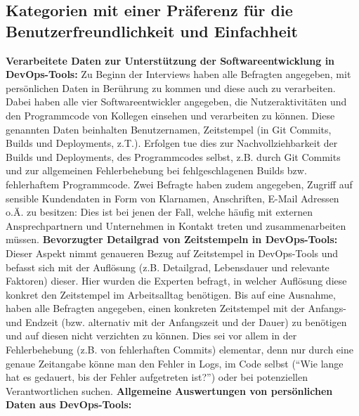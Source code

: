 \subsection{Kategorien mit einer Präferenz für die Benutzerfreundlichkeit und Einfachheit} \label{noprivacy}
\textbf{Verarbeitete Daten zur Unterstützung der Softwareentwicklung in DevOps-Tools:} \newline
Zu Beginn der Interviews haben alle Befragten angegeben, mit persönlichen Daten in Berührung zu kommen und diese auch zu verarbeiten. Dabei haben alle vier Softwareentwickler angegeben, die Nutzeraktivitäten und den Programmcode von Kollegen 
einsehen und verarbeiten zu können. Diese genannten Daten beinhalten Benutzernamen, Zeitstempel (in Git Commits, Builds und Deployments, z.T.).
Erfolgen tue dies zur Nachvollziehbarkeit der Builds und Deployments, des Programmcodes selbst, z.B. durch Git Commits und zur allgemeinen Fehlerbehebung bei fehlgeschlagenen Builds bzw. fehlerhaftem Programmcode. 
Zwei Befragte haben zudem angegeben, Zugriff auf sensible Kundendaten in Form von Klarnamen, Anschriften, E-Mail Adressen o.Ä. zu besitzen: Dies ist bei jenen der Fall, welche häufig mit externen Ansprechpartnern und Unternehmen in Kontakt treten 
und zusammenarbeiten müssen. \newline \newline
\textbf{Bevorzugter Detailgrad von Zeitstempeln in DevOps-Tools:} \newline
Dieser Aspekt nimmt genaueren Bezug auf Zeitstempel in DevOps-Tools und befasst sich mit der Auflösung (z.B. Detailgrad, Lebensdauer und relevante Faktoren) dieser. Hier wurden die Experten befragt, in welcher Auflösung diese konkret den Zeitstempel 
im Arbeitsalltag benötigen. Bis auf eine Ausnahme, haben alle Befragten angegeben, einen konkreten Zeitstempel mit der Anfangs- und Endzeit (bzw. alternativ mit der Anfangszeit und der Dauer) zu benötigen und auf diesen nicht verzichten zu können. Dies sei
vor allem in der Fehlerbehebung (z.B. von fehlerhaften Commits) elementar, denn nur durch eine genaue Zeitangabe könne man den Fehler in Logs, im Code selbst (\enquote{Wie lange hat es gedauert, bis der Fehler aufgetreten ist?}) oder bei potenziellen Verantwortlichen 
suchen. \newline \newline
\textbf{Allgemeine Auswertungen von persönlichen Daten aus DevOps-Tools:} \newline
{}
